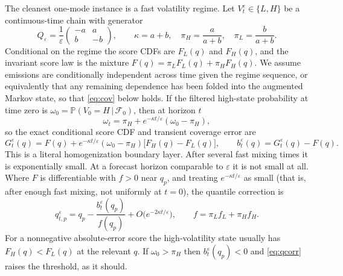\documentclass[11pt]{article}
\theoremstyle{definition}
\theoremstyle{remark}
\newcommand{\Prob}{\mathbb{P}}
\newcommand{\given}{\,|\,}
\newcommand{\Fcal}{\mathcal{F}}
\begin{document}
The cleanest one-mode instance is a fast volatility regime. Let $V^\varepsilon_t\in\{L,H\}$
be a continuous-time chain with generator
\begin{equation}\label{eq:generator}
  Q_\varepsilon = \frac1\varepsilon\begin{pmatrix} -a & a\\ b & -b\end{pmatrix},
  \qquad \kappa = a+b, \quad \pi_H = \frac{a}{a+b},\quad \pi_L=\frac{b}{a+b}.
\end{equation}
Conditional on the regime the score CDFs are $F_L(q)$ and $F_H(q)$, and the invariant score
law is the mixture $F(q)=\pi_L F_L(q)+\pi_H F_H(q)$. We assume emissions are conditionally
independent across time given the regime sequence, or equivalently that any remaining
dependence has been folded into the augmented Markov state, so that \eqref{eq:cov} below
holds. If the filtered high-state probability at time zero is
$\omega_0=\Prob(V_0=H\given\Fcal_0)$, then at horizon $t$
\begin{equation}\label{eq:omega}
  \omega_t = \pi_H + e^{-\kappa t/\varepsilon}(\omega_0 - \pi_H) ,
\end{equation}
so the exact conditional score CDF and transient coverage error are
\begin{equation}\label{eq:Gt}
  G^\varepsilon_t(q) = F(q) + e^{-\kappa t/\varepsilon}(\omega_0-\pi_H)\big[F_H(q)-F_L(q)\big],
  \qquad
  b^\varepsilon_t(q) = G^\varepsilon_t(q) - F(q) .
\end{equation}
This is a literal homogenization boundary layer. After several fast mixing times it is
exponentially small. At a forecast horizon comparable to $\varepsilon$ it is not small at
all. Where $F$ is differentiable with $f>0$ near $q_p$, and treating $e^{-\kappa t/\varepsilon}$
as small (that is, after enough fast mixing, not uniformly at $t=0$), the quantile correction
is
\begin{equation}\label{eq:qcorr}
  q^\varepsilon_{t,p} = q_p - \frac{b^\varepsilon_t(q_p)}{f(q_p)} + O\big(e^{-2\kappa t/\varepsilon}\big),
  \qquad f = \pi_L f_L + \pi_H f_H .
\end{equation}
For a nonnegative absolute-error score the high-volatility state usually has $F_H(q)<F_L(q)$
at the relevant $q$. If $\omega_0>\pi_H$ then $b^\varepsilon_t(q_p)<0$ and \eqref{eq:qcorr}
raises the threshold, as it should.
\end{document}
